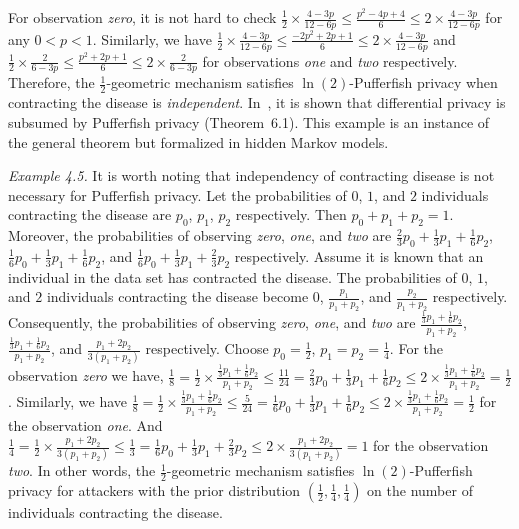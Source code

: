 For observation \textit{zero}, it is not hard to check $\frac{1}{2}
\times \frac{4-3p}{12-6p} \leq \frac{p^2 - 4p + 4}{6} \leq 2 \times
\frac{4-3p}{12-6p}$ for any $0 < p < 1$. Similarly, we have
$\frac{1}{2} \times
\frac{4-3p}{12-6p} \leq \frac{-2p^2 + 2p + 1}{6} \leq 2 \times
\frac{4-3p}{12-6p}$ and $\frac{1}{2} \times \frac{2}{6-3p} \leq
\frac{p^2 + 2p + 1}{6} \leq 2 \times \frac{2}{6-3p}$  for observations
\textit{one} and \textit{two} respectively. Therefore, the
$\frac{1}{2}$-geometric mechanism satisfies $\ln(2)$-Pufferfish
privacy when contracting the disease is \emph{independent}.
In~\cite{KM:14:PFMPD}, it is shown that differential privacy is
subsumed by Pufferfish privacy (Theorem~6.1). This example is an
instance of the general theorem but formalized in hidden Markov
models.

\noindent
\textit{Example 4.5.}
It is worth noting that independency of contracting disease is not
necessary for Pufferfish privacy. Let the probabilities of $0$, $1$,
and $2$ individuals contracting the disease are $p_0$, $p_1$, $p_2$
respectively. Then $p_0 + p_1 + p_2 = 1$. Moreover, the probabilities
of observing \textit{zero}, \textit{one}, and \textit{two} are
$\frac{2}{3} p_0 + \frac{1}{3} p_1 + \frac{1}{6} p_2$,
$\frac{1}{6} p_0 + \frac{1}{3} p_1 + \frac{1}{6} p_2$, and
$\frac{1}{6} p_0 + \frac{1}{3} p_1 + \frac{2}{3} p_2$ respectively.
Assume it is known that an individual in the data set has contracted
the disease. The probabilities of $0$, $1$, and $2$ individuals
contracting the disease become $0$, $\frac{p_1}{p_1 + p_2}$, and
$\frac{p_2}{p_1 + p_2}$ respectively. Consequently, the probabilities
of observing \textit{zero}, \textit{one}, and \emph{two} are
$\frac{\frac{1}{3}p_1 + \frac{1}{6}p_2}{p_1 + p_2}$,
$\frac{\frac{1}{3}p_1 + \frac{1}{6}p_2}{p_1 + p_2}$, and
$\frac{p_1 + 2p_2}{3(p_1 + p_2)}$ respectively. Choose $p_0 =
\frac{1}{2}$, $p_1 = p_2 = \frac{1}{4}$. For the observation
\textit{zero} we have,
$\frac{1}{8} =
\frac{1}{2} \times \frac{\frac{1}{3}p_1 + \frac{1}{6}p_2}{p_1 + p_2}
\leq
\frac{11}{24} =
\frac{2}{3} p_0 + \frac{1}{3} p_1 + \frac{1}{6} p_2
\leq
{2} \times \frac{\frac{1}{3}p_1 + \frac{1}{6}p_2}{p_1 + p_2}
= \frac{1}{2}$.
Similarly, we have
$
\frac{1}{8} =
\frac{1}{2} \times \frac{\frac{1}{3}p_1 + \frac{1}{6}p_2}{p_1 + p_2}
\leq
\frac{5}{24} =
\frac{1}{6} p_0 + \frac{1}{3} p_1 + \frac{1}{6} p_2
\leq
2 \times \frac{\frac{1}{3}p_1 + \frac{1}{6}p_2}{p_1 + p_2}
= \frac{1}{2}$ for the observation \textit{one}. And
$
\frac{1}{4}
=
\frac{1}{2} \times \frac{p_1 + 2p_2}{3(p_1 + p_2)}
\leq
\frac{1}{3}
=
\frac{1}{6} p_0 + \frac{1}{3} p_1 + \frac{2}{3} p_2
\leq
2 \times \frac{p_1 + 2p_2}{3(p_1 + p_2)}
= 1$ for the observation \textit{two}. In other words, the
$\frac{1}{2}$-geometric mechanism satisfies $\ln(2)$-Pufferfish privacy for
attackers with the prior distribution $(\frac{1}{2}, \frac{1}{4},
\frac{1}{4})$ on the number of individuals contracting the disease.


